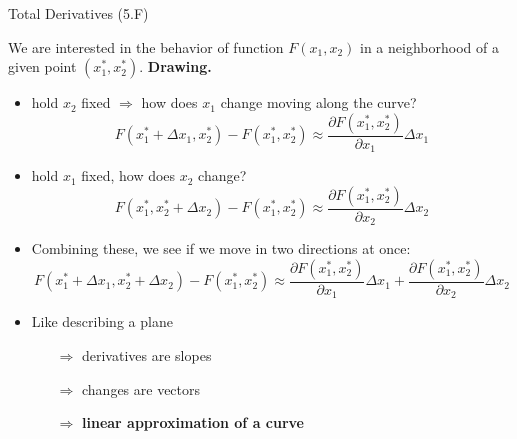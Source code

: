 \documentclass[xcolor=dvipsnames, compress, t]{beamer}
\newcommand{\draw}{{\color{Plum} \bf Drawing.}}
\begin{document}
\begin{frame}{Total Derivatives (5.F)}

We are interested in the behavior of function $F(x_1, x_2)$ in a neighborhood of a given point $(x_1^*, x_2^*)$.
\draw \pause
\begin{itemize}
\item hold $x_2$ fixed \pause $\Rightarrow$ how does $x_1$ change moving along the curve? \pause
$$F(x_1^* + \Delta x_1, x_2^*) - F(x_1^*, x_2^*) \approx \frac{\partial F(x_1^*, x_2^*)}{\partial x_1} \Delta x_1$$ 

\item \pause hold $x_1$ fixed, how does $x_2$ change?
$$F(x_1^* , x_2^*+ \Delta x_2) - F(x_1^*, x_2^*) \approx \frac{\partial F(x_1^*, x_2^*)}{\partial x_2} \Delta x_2$$ 

\item \pause Combining these, we see if we move in two directions at once: \pause
$$F(x_1^* + \Delta x_1, x_2^*+ \Delta x_2) - F(x_1^*, x_2^*) \approx \frac{\partial F(x_1^*, x_2^*)}{\partial x_1} \Delta x_1 + \frac{\partial F(x_1^*, x_2^*)}{\partial x_2} \Delta x_2$$


\item \pause Like describing a plane \pause
\begin{itemize}
\item[$\Rightarrow$] derivatives are slopes\pause
\item[$\Rightarrow$] changes are vectors \pause
\item[$\Rightarrow$] {\bf linear approximation of a curve}
\end{itemize}
\end{itemize} 

\end{frame}
\end{document}
